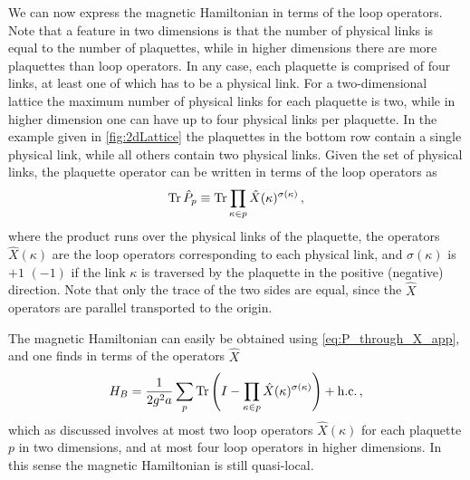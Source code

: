 \documentclass[reprint,superscriptaddress,pra,nofootinbib,preprintnumbers,floatfix]{revtex4-1}
\begin{document}
We can now express the magnetic Hamiltonian in terms of the loop operators. 
%
Note that a feature in two dimensions is that the number of physical links is equal to the number of plaquettes, while in higher dimensions there are more plaquettes than loop operators. 
%
In any case, each plaquette is comprised of four links, at least one of which has to be a physical link. 
%
For a two-dimensional lattice the maximum number of physical links for each plaquette is two, while in higher dimension one can have up to four physical links per plaquette.
%
In the example given in \cref{fig:2dLattice} the plaquettes in the bottom row contain a single physical link, while all others contain two physical links. 
%
Given the set of physical links, the plaquette operator can be written in terms of the loop operators as
%
\begin{align}
\label{eq:P_through_X_app}
    \Tr \hat P_p \equiv \Tr \prod_{\kappa\in p} \hat X(\kappa)^{\sigma(\kappa)}
    \,,
\end{align}
%
where the product runs over the physical links of the plaquette, the operators $\hat X(\kappa)$ are the loop operators corresponding to each physical link, and $\sigma(\kappa)$ is $+1$ $(-1)$ if the link $\kappa$ is traversed by the plaquette in the positive (negative) direction. 
%
Note that only the trace of the two sides are equal, since the $\hat X$ operators are parallel transported to the origin.

The magnetic Hamiltonian can easily be obtained using \cref{eq:P_through_X_app}, and one finds in terms of the operators $\hat X$
%
\begin{align}
\label{eq:HB_max_tree}
    H_B = \frac{1}{2g^2 a}\sum_p \Tr \left( I - \prod_{\kappa\in p} \hat X(\kappa)^{\sigma(\kappa)} \right) + \mathrm{h.c.}
    \,,
\end{align}
%
which as discussed involves at most two loop operators $\hat X(\kappa)$ for each plaquette $p$ in two dimensions, and at most four loop operators in higher dimensions. 
%
In this sense the magnetic Hamiltonian is still quasi-local.
\end{document}
